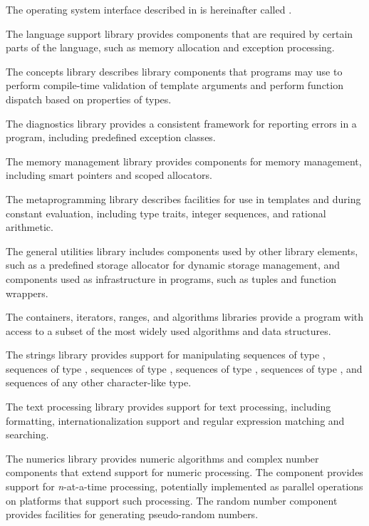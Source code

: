 \pnum
The operating system interface described in \IsoPosix{} is
hereinafter called .

\pnum
The language support library provides components that are
required by certain parts of the \Cpp{} language,
such as memory allocation and
exception processing.

\pnum
The concepts library describes library components that \Cpp{}
programs may use to perform compile-time validation of template arguments and
perform function dispatch based on properties of types.

\pnum
The diagnostics library provides a consistent framework for
reporting errors in a \Cpp{} program, including predefined exception classes.

\pnum
The memory management library provides components for
memory management, including smart pointers and scoped allocators.

\pnum
The metaprogramming library describes facilities
for use in templates and during constant evaluation,
including type traits, integer sequences, and rational arithmetic.

\pnum
The general utilities library includes components used
by other library elements, such as a predefined storage allocator for dynamic
storage management, and components used
as infrastructure
in \Cpp{} programs,
such as tuples and function wrappers.

\pnum
The containers, iterators, ranges,
and algorithms libraries provide a \Cpp{} program with access
to a subset of the most widely used algorithms and data structures.

\pnum
The strings library provides support
for manipulating sequences of type ,
sequences of type ,
sequences of type ,
sequences of type ,
sequences of type ,
and sequences of any other character-like type.

\pnum
The text processing library provides support for text processing,
including formatting, internationalization support and
regular expression matching and searching.

\pnum
The numerics library provides
numeric algorithms and complex number components that extend support for numeric processing.
The
component provides support for
\textit{n}-at-a-time
processing,
potentially implemented as parallel operations on platforms that support such processing.
The random number component provides facilities for generating pseudo-random numbers.

